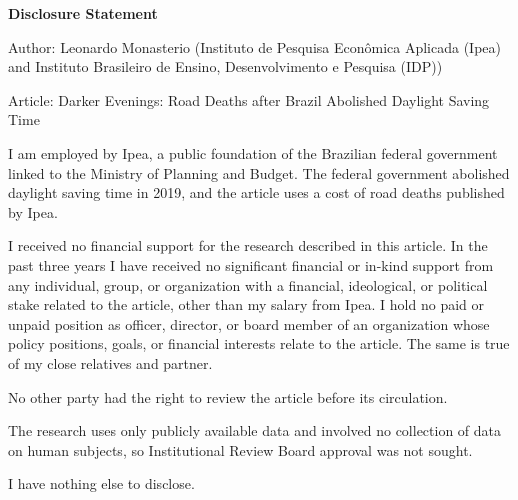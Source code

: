 \documentclass[12pt]{article}
\begin{document}
\begin{center}\Large\textbf{Disclosure Statement}\end{center}

Author: Leonardo Monasterio (Instituto de Pesquisa Econ\^omica Aplicada (Ipea) and Instituto Brasileiro de Ensino, Desenvolvimento e Pesquisa (IDP))

Article: Darker Evenings: Road Deaths after Brazil Abolished Daylight Saving Time

I am employed by Ipea, a public foundation of the Brazilian federal government linked to the Ministry of Planning and Budget. The federal government abolished daylight saving time in 2019, and the article uses a cost of road deaths published by Ipea.

I received no financial support for the research described in this article. In the past three years I have received no significant financial or in-kind support from any individual, group, or organization with a financial, ideological, or political stake related to the article, other than my salary from Ipea. I hold no paid or unpaid position as officer, director, or board member of an organization whose policy positions, goals, or financial interests relate to the article. The same is true of my close relatives and partner.

No other party had the right to review the article before its circulation.

The research uses only publicly available data and involved no collection of data on human subjects, so Institutional Review Board approval was not sought.

I have nothing else to disclose.
\end{document}
